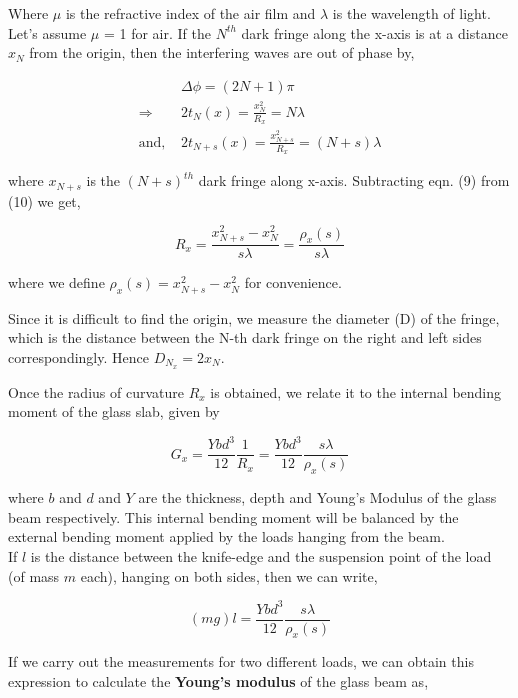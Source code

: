 Where $\mu$ is the refractive index of the air film and $\lambda$ is the wavelength of light. Let's assume $\mu$ = 1 for air. If the $N^{th}$ dark fringe along the x-axis is at a distance $x_N$ from the origin, then the interfering waves are out of phase by,

\begin{align}
    & \Delta \phi = (2N + 1)\pi \\
     \Rightarrow & 2t_N(x) = \frac{x_N^2}{R_x}=N\lambda \\
    \text{and, } & 2t_{N+s}(x) = \frac{x_{N+s}^2}{R_x}=(N+s)\lambda
\end{align}

where $x_{N+s}$ is the $(N+s)^{th}$ dark fringe along x-axis. Subtracting eqn. (9) from (10) we get,

\begin{equation}
    R_x =  \frac{x_{N+s}^2 - x_N^2}{s\lambda} = \frac{\rho_x(s)}{s\lambda}
\end{equation}

where we define $\rho_x(s) = x_{N+s}^2 - x_N^2$ for convenience.

Since it is difficult to find the origin, we measure the diameter (D) of the fringe, which is the distance between the N-th dark fringe on the right and left sides correspondingly. Hence $D_{N_x} = 2x_N$.

Once the radius of curvature $R_x$ is obtained, we relate it to the internal bending moment of the glass slab, given by

\begin{equation}
    G_x = \frac{Ybd^3}{12}\frac{1}{R_x} = \frac{Ybd^3}{12}\frac{s\lambda}{\rho_x(s)}
\end{equation}

where $b$ and $d$ and $Y$ are the thickness, depth and Young's Modulus of the glass beam respectively. This internal bending moment will be balanced by the external bending moment applied by the loads hanging from the beam.\\
If $l$ is the distance between the knife-edge and the suspension point of the load (of mass $m$ each), hanging on both sides, then we can write,

\begin{equation}
    (mg)l = \frac{Ybd^3}{12}\frac{s\lambda}{\rho_x(s)}
\end{equation}

If we carry out the measurements for two different loads, we can obtain this expression to calculate the  \textbf{Young's modulus} of the glass beam as,

